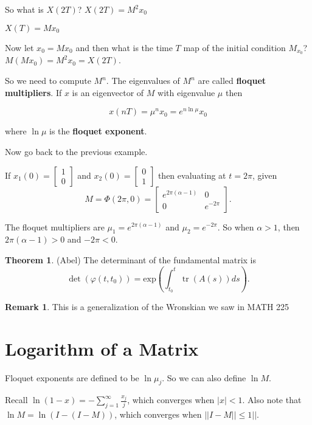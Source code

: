 \documentclass[12pt]{article}
\theoremstyle{definition}
\newtheorem{theorem}{Theorem}[section]  %
\newtheorem*{remark}{Remark}
\newcommand\tr{\mathop{\mathrm{tr}}}
\begin{document}
So what is $X(2T)$? $X(2T) = M^2 x_0$

$X(T) = Mx_0$

Now let $x_0 = M x_0$ and then what is the time $T$ map of the initial condition $M_{x_{0}}$?
$M(Mx_0) = M^2 x_0 = X(2T)$.

So we need to compute $M^n$. The eigenvalues of $M^n$ are called \textbf{floquet multipliers}. If
$x$ is an eigenvector of $M$ with eigenvalue $\mu$ then

\[
x(nT) = \mu^n x_0 = e^{n \ln \mu} x_0
\]

where $\ln \mu$ is the \textbf{floquet exponent}.

Now go back to the previous example.

If $x_1(0) = \begin{bmatrix} 1 \\ 0 \end{bmatrix}$ and $x_2(0) = \begin{bmatrix} 0 \\ 1 \end{bmatrix}$ 
then evaluating at $t = 2\pi$, given 
\[
M = \Phi (2\pi, 0) = 
\begin{bmatrix}
e^{2\pi (\alpha - 1)} & 0 \\
0 & e^{-2\pi}
\end{bmatrix}.
\]

The floquet multipliers are $\mu_1 = e^{2\pi (\alpha - 1)}$ and $\mu_2 = e^{-2\pi}$. So when
$\alpha > 1$, then $2\pi(\alpha - 1) > 0$ and $-2\pi < 0$.

\begin{theorem} (Abel)
The determinant of the fundamental matrix is
\[
\det(\varphi(t, t_0)) = \text{exp} \left( \int_{t_0}^t \tr (A(s)) ds \right).
\]
\end{theorem}

\begin{remark}
This is a generalization of the Wronskian we saw in MATH 225
\end{remark}

\section{Logarithm of a Matrix}

Floquet exponents are defined to be $\ln \mu_j$. So we can also define $\ln M$.

Recall $\ln (1-x) = \displaystyle - \sum_{j = 1}^{\infty} \frac{x_j}{j}$, which
converges when $|x| < 1$. Also note that $\ln M = \ln (I - (I - M))$, which
converges when $||I - M|| \leq 1||$.
\end{document}
